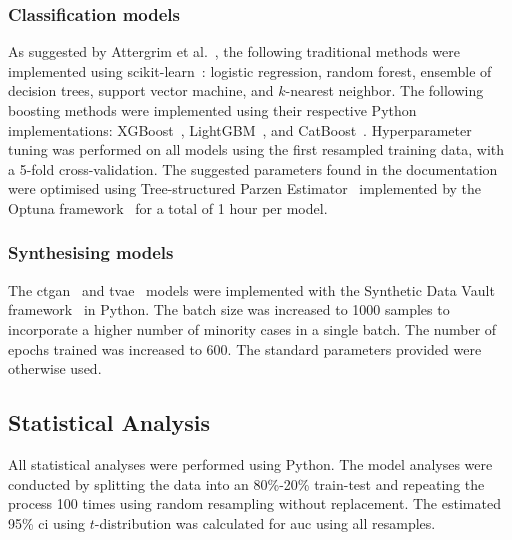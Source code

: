 \documentclass[12pt, a4paper]{article}
\begin{document}
\subsubsection*{Classification models}
As suggested by Attergrim et al.~\cite{attergrim_predicting_2023}, the following traditional methods were
implemented using scikit-learn~\cite{pedregosa_scikit_2011}: logistic regression, random forest, ensemble
of decision trees, support vector machine, and $k$-nearest neighbor. The following boosting methods were
implemented using their respective Python implementations: XGBoost~\cite{chen_xgboost_2016},
LightGBM~\cite{ke_lightgbm_2017}, and CatBoost~\cite{prokhorenkova_catboost_2018}. Hyperparameter tuning
was performed on all models using the first resampled training data, with a 5-fold cross-validation. The suggested
parameters found in the documentation were optimised using Tree-structured Parzen
Estimator~\cite{bergstra_algorithms_2011} implemented by the Optuna framework~\cite{optuna_2019} for a total of
1 hour per model.

\subsubsection*{Synthesising models}
The \acrfull{ctgan}~\cite{xu_modeling_2019} and \acrfull{tvae}~\cite{ishfaq_tvae_2018} models were implemented with the
Synthetic Data Vault framework~\cite{patki_sdv_2016} in Python. The batch size was increased to 1000 samples to
incorporate a higher number of minority cases in a single batch. The number of epochs trained was increased to 600.
The standard parameters provided were otherwise used.

\subsection{Statistical Analysis}
All statistical analyses were performed using Python. The model analyses were conducted by splitting the data into an
80\%-20\% train-test and repeating the process 100 times using random resampling without replacement. The estimated
95\% \acrfull{ci} using $t$-distribution was calculated for \acrfull{auc} using all resamples.
\end{document}
